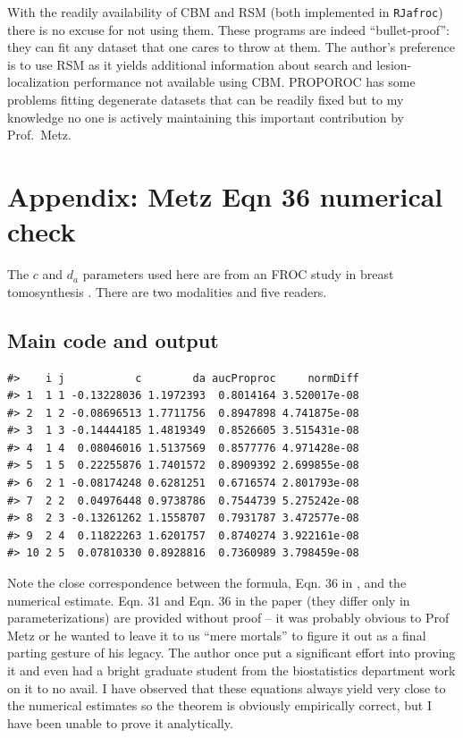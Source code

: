 \documentclass[
]{book}
\begin{document}
With the readily availability of CBM and RSM (both implemented in \texttt{RJafroc}) there is no excuse for not using them. These programs are indeed ``bullet-proof'': they can fit any dataset that one cares to throw at them. The author's preference is to use RSM as it yields additional information about search and lesion-localization performance not available using CBM. PROPOROC has some problems fitting degenerate datasets that can be readily fixed but to my knowledge no one is actively maintaining this important contribution by Prof.~Metz.

\hypertarget{proper-roc-models-metz-eqn-36}{%
\section{Appendix: Metz Eqn 36 numerical check}\label{proper-roc-models-metz-eqn-36}}

The \(c\) and \(d_a\) parameters used here are from an FROC study in breast tomosynthesis \citep{andersson2008breast}. There are two modalities and five readers.

\hypertarget{main-code-and-output}{%
\subsection{Main code and output}\label{main-code-and-output}}

\begin{verbatim}
#>    i j           c        da aucProproc     normDiff
#> 1  1 1 -0.13228036 1.1972393  0.8014164 3.520017e-08
#> 2  1 2 -0.08696513 1.7711756  0.8947898 4.741875e-08
#> 3  1 3 -0.14444185 1.4819349  0.8526605 3.515431e-08
#> 4  1 4  0.08046016 1.5137569  0.8577776 4.971428e-08
#> 5  1 5  0.22255876 1.7401572  0.8909392 2.699855e-08
#> 6  2 1 -0.08174248 0.6281251  0.6716574 2.801793e-08
#> 7  2 2  0.04976448 0.9738786  0.7544739 5.275242e-08
#> 8  2 3 -0.13261262 1.1558707  0.7931787 3.472577e-08
#> 9  2 4  0.11822263 1.6201757  0.8740274 3.922161e-08
#> 10 2 5  0.07810330 0.8928816  0.7360989 3.798459e-08
\end{verbatim}

Note the close correspondence between the formula, Eqn. 36 in \citep{metz1999proper}, and the numerical estimate. Eqn. 31 and Eqn. 36 in the paper (they differ only in parameterizations) are provided without proof -- it was probably obvious to Prof Metz or he wanted to leave it to us ``mere mortals'' to figure it out as a final parting gesture of his legacy. The author once put a significant effort into proving it and even had a bright graduate student from the biostatistics department work on it to no avail. I have observed that these equations always yield very close to the numerical estimates so the theorem is obviously empirically correct, but I have been unable to prove it analytically.
\end{document}
